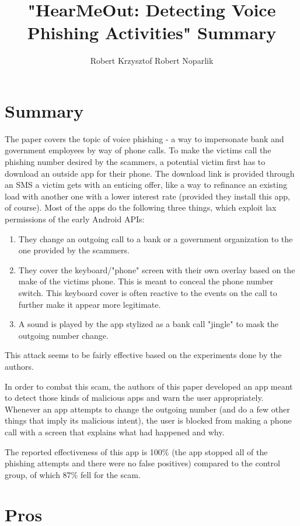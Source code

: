 \documentclass{article}
\title{"HearMeOut: Detecting Voice Phishing Activities" Summary}
\author{Robert Krzysztof Robert Noparlik}
\begin{document}
\maketitle

\section{Summary}

The paper covers the topic of voice phishing - a way to impersonate bank and government employees by way of phone calls. To make the victims call the phishing number desired by the scammers, a potential victim first has to download an outside app for their phone. The download link is provided through an SMS a victim gets with an enticing offer, like a way to refinance an existing load with another one with a lower interest rate (provided they install this app, of course).
Most of the apps do the following three things, which exploit lax permissions of the early Android APIs:

\begin{enumerate}
	\item They change an outgoing call to a bank or a government organization to the one provided by the scammers.
	\item They cover the keyboard/"phone" screen with their own overlay based on the make of the victims phone. This is meant to conceal the phone number switch. This keyboard cover is often reactive to the events on the call to further make it appear more legitimate.
	\item A sound is played by the app stylized as a bank call "jingle" to mask the outgoing number change.
\end{enumerate}

This attack seems to be fairly effective based on the experiments done by the authors.

In order to combat this scam, the authors of this paper developed an app meant to detect those kinds of malicious apps and warn the user appropriately. Whenever an app attempts to change the outgoing number (and do a few other things that imply its malicious intent), the user is blocked from making a phone call with a screen that explains what had happened and why.

The reported effectiveness of this app is 100\% (the app stopped all of the phishing attempts and there were no false positives) compared to the control group, of which 87\% fell for the scam. 

\section{Pros}
\end{document}
